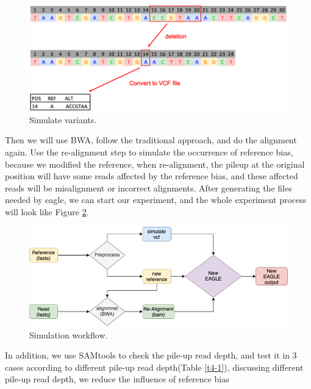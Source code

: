 \vspace{1cm}
\begin{figure}[H]
    \centering
    \includegraphics[width=1\columnwidth]{body/image/4-1.png}
    \captionsetup{labelfont=bf}
    \renewcommand{\baselinestretch}{1.0}
    \vspace{-1cm}
    \caption[Simulate variants]{Simulate variants.}
    \label{f4-1}
\end{figure}

Then we will use BWA, follow the traditional approach, and do the alignment again. Use the re-alignment step to simulate the occurrence of reference bias, because we modified the reference, when re-alignment, the pileup at the original position will have some reads affected by the reference bias, and these affected reads will be misalignment or incorrect alignments. After generating the files needed by eagle, we can start our experiment, and the whole experiment process will look like Figure \ref{f4-2}.

\vspace{1cm}
\begin{figure}[H]
    \centering
    \includegraphics[width=1\columnwidth]{body/image/4-2.png}
    \captionsetup{labelfont=bf}
    \renewcommand{\baselinestretch}{1.0}
    \vspace{-1cm}
    \caption[Simulation workflow]{Simulation workflow.}
    \label{f4-2}
\end{figure}

In addition, we use SAMtools to check the pile-up read depth, and test it in 3 cases according to different pile-up read depth(Table \ref{t4-1}), discussing different pile-up read depth, we reduce the influence of reference bias

